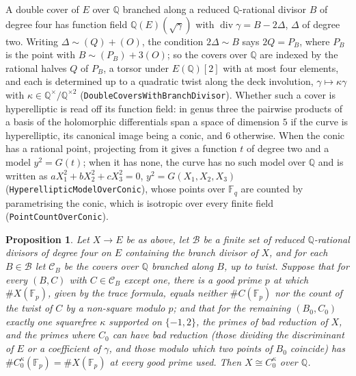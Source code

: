 \documentclass[11pt,reqno]{amsart}
\theoremstyle{plain}
\newtheorem{proposition}[theorem]{Proposition}
\theoremstyle{definition}
\DeclareMathOperator{\Div}{div}
\newcommand{\Q}{\mathbb{Q}}
\newcommand{\F}{\mathbb{F}}
\begin{document}
A double cover of $E$ over $\Q$ branched along a reduced $\Q$-rational divisor $B$ of degree four
has function field $\Q(E)(\sqrt\gamma)$ with $\Div\gamma=B-2\Delta$, $\Delta$ of degree two. Writing
$\Delta\sim(Q)+(O)$, the condition $2\Delta\sim B$ says $2Q=P_B$, where $P_B$ is the point with
$B\sim(P_B)+3(O)$; so the covers over $\Q$ are indexed by the rational halves $Q$ of $P_B$, a torsor
under $E(\Q)[2]$ with at most four elements, and each is determined up to a quadratic twist along
the deck involution, $\gamma\mapsto\kappa\gamma$ with $\kappa\in\Q^\times/\Q^{\times2}$
(\texttt{DoubleCoversWithBranchDivisor}). Whether such a cover is hyperelliptic is read off its
function field: in genus three the pairwise products of a basis of the holomorphic differentials
span a space of dimension $5$ if the curve is hyperelliptic, its canonical image being a conic, and
$6$ otherwise. When the conic has a rational point, projecting from it gives a function $t$ of
degree two and a model $y^2=G(t)$; when it has none, the curve has no such model over $\Q$ and is
written as $aX_1^2+bX_2^2+cX_3^2=0$, $y^2=G(X_1,X_2,X_3)$ (\texttt{HyperellipticModelOverConic}),
whose points over $\F_q$ are counted by parametrising the conic, which is isotropic over every
finite field (\texttt{PointCountOverConic}).

\begin{proposition}\label{prop:certify}
Let $X\to E$ be as above, let $\mathcal B$ be a finite set of reduced $\Q$-rational divisors of
degree four on $E$ containing the branch divisor of $X$, and for each $B\in\mathcal B$ let
$\mathcal C_B$ be the covers over $\Q$ branched along $B$, up to twist. Suppose that for every
$(B,C)$ with $C\in\mathcal C_B$ except one, there is a good prime $p$ at which $\#X(\F_p)$, given by
the trace formula, equals neither $\#C(\F_p)$ nor the count of the twist of $C$ by a non-square
modulo $p$; and that for the remaining $(B_0,C_0)$ exactly one squarefree $\kappa$ supported on
$\{-1,2\}$, the primes of bad reduction of $X$, and the primes where $C_0$ can have bad reduction
(those dividing the discriminant of $E$ or a coefficient of $\gamma$, and those modulo which two
points of $B_0$ coincide) has $\#C_0^{\kappa}(\F_p)=\#X(\F_p)$ at every good prime used. Then
$X\cong C_0^{\kappa}$ over $\Q$.
\end{proposition}
\end{document}
